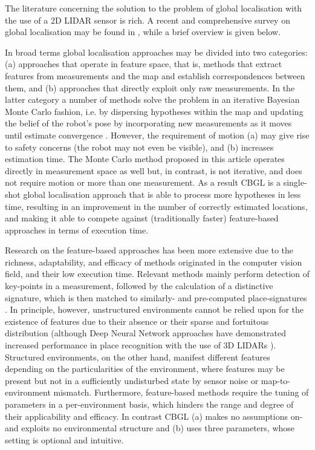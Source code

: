 The literature concerning the solution to the problem of global localisation
with the use of a 2D LIDAR sensor is rich. A recent and comprehensive survey on
global localisation may be found in \cite{gl_survey_cn}, while a brief overview
is given below.

In broad terms global localisation approaches may be divided into two
categories: (a) approaches that operate in feature space, that is, methods that
extract features from measurements and the map and establish correspondences
between them, and (b) approaches that directly exploit only raw measurements.
In the latter category a number of methods solve the problem in an iterative
Bayesian Monte Carlo fashion, i.e. by dispersing hypotheses within the map and
updating the belief of the robot's pose by incorporating new measurements as it
moves until estimate convergence
\cite{mcl,Wang2018d,Yilmaz2019a,gmcl,Chen2021a}. However, the requirement of
motion (a) may give rise to safety concerns (the robot may not even be
visible), and (b) increases estimation time. The Monte Carlo method proposed in
this article operates directly in measurement space as well but, in contrast,
is not iterative, and does not require motion or more than one measurement. As
a result CBGL is a single-shot global localisation approach that is able to
process more hypotheses in less time, resulting in an improvement in the number
of correctly estimated locations, and making it able to compete against
(traditionally faster) feature-based approaches in terms of execution time.

Research on the feature-based approaches has been more extensive due to the
richness, adaptability, and efficacy of methods originated in the computer
vision field, and their low execution time. Relevant methods mainly perform
detection of key-points in a measurement, followed by the calculation of a
distinctive signature, which is then matched to similarly- and pre-computed
place-signatures
\cite{Kallasi2016a,als_eth,Usman2019,Wang2021b,Meng2021,Hendrikx2021,An2022,Nielsen2023}.
In principle, however, unstructured environments cannot be relied upon for the
existence of features due to their absence or their sparse and fortuitous
distribution (although Deep Neural Network approaches have demonstrated
increased performance in place recognition with the use of 3D LIDARs
\cite{Xu2021,Yin2022,Komorowski2022}). Structured environments, on the other
hand, manifest different features depending on the particularities of the
environment, where features may be present but not in a sufficiently
undisturbed state by sensor noise or map-to-environment mismatch. Furthermore,
feature-based methods require the tuning of parameters in a per-environment
basis, which hinders the range and degree of their applicability and efficacy.
In contrast CBGL (a) makes no assumptions on- and exploits no environmental
structure and (b) uses three parameters, whose setting is optional and
intuitive.

